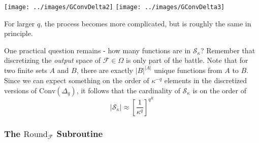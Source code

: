 \documentclass[letterpaper, 12pt]{article}
\numberwithin{equation}{section}
\begin{document}
\begin{center}
\texttt{[image: ../images/GConvDelta2]} \qquad
\texttt{[image: ../images/GConvDelta3]}
\end{center}

For larger $q$, the process becomes more complicated, but is roughly the same in principle.

One practical question remains - how many functions are in $\mathcal{S}_\kappa$? Remember that discretizing the \textit{output} space of $\mathcal{F} \in \Omega$ is only part of the battle. Note that for two finite sets $A$ and $B$, there are exactly $|B|^{|A|}$ unique functions from $A$ to $B$. Since we can expect something on the order of $\kappa^{-q}$ elements in the discretized versions of $\text{Conv}(\Delta_q)$, it follows that the cardinality of $\mathcal{S}_\kappa$ is on the order of
\begin{equation}
|\mathcal{S}_\kappa| \approx \left[\frac{1}{\kappa^q}\right]^{q^R}
\end{equation}

\subsubsection{The $\text{Round}_{\mathcal{F}}$ Subroutine}
\end{document}
